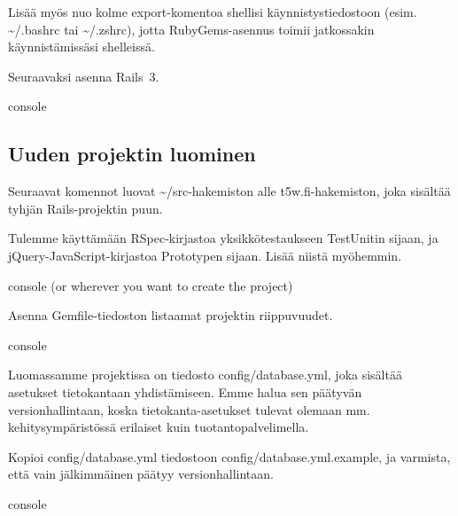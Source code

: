 \documentclass{article}
\begin{document}
Lisää myös nuo kolme export-komentoa shellisi käynnistystiedostoon (esim.
\textasciitilde/.bashrc tai \textasciitilde/.zshrc), jotta RubyGems-asennus
toimii jatkossakin käynnistämissäsi shelleissä.

\begin{samepage}
Seuraavaksi asenna Rails~3.

\begin{pygmented}{console}
\end{pygmented}
\end{samepage}

\subsection{Uuden projektin luominen}

\begin{samepage}
Seuraavat komennot luovat \textasciitilde/src-hakemiston alle
t5w.fi-hakemiston, joka sisältää tyhjän Rails-projektin puun.

Tulemme käyttämään RSpec-kirjastoa yksikkötestaukseen TestUnitin sijaan, ja
jQuery-JavaScript-kirjastoa Prototypen sijaan. Lisää niistä myöhemmin.

\begin{pygmented}{console}
(or wherever you want to create the project)

\end{pygmented}
\end{samepage}

\begin{samepage}
Asenna Gemfile-tiedoston listaamat projektin riippuvuudet.

\begin{pygmented}{console}
\end{pygmented}
\end{samepage}

Luomassamme projektissa on tiedosto config/database.yml, joka sisältää
asetukset tietokantaan yhdistämiseen. Emme halua sen päätyvän
versionhallintaan, koska tietokanta-asetukset tulevat olemaan mm.
kehitysympäristössä erilaiset kuin tuotantopalvelimella.

\begin{samepage}
Kopioi config/database.yml tiedostoon config/database.yml.example, ja varmista,
että vain jälkimmäinen päätyy versionhallintaan.

\begin{pygmented}{console}
\end{pygmented}
\end{samepage}
\end{document}
